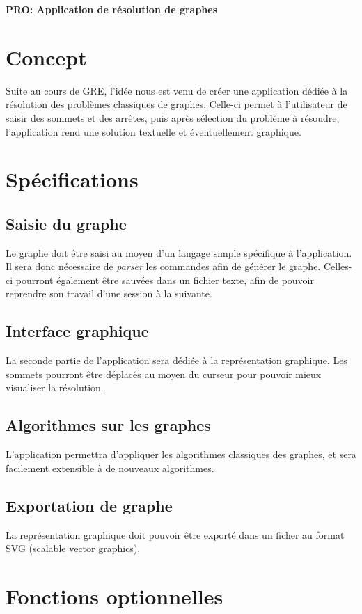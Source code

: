 \documentclass[french]{article}
\begin{document}
	\centering
	\large{\textbf{PRO: Application de résolution de graphes}}
	
	\justify
	
	\section{Concept}
		Suite au cours de GRE, l'idée nous est venu de créer une application dédiée à la résolution des problèmes classiques de graphes. Celle-ci permet à l'utilisateur de saisir des sommets et des arrêtes, puis après sélection du problème à résoudre, l'application rend une solution textuelle et éventuellement graphique.
		
	\section{Spécifications}
		\subsection{Saisie du graphe}
			Le graphe doit être saisi au moyen d'un langage simple spécifique à l'application. Il sera donc nécessaire de \textit{parser} les commandes afin de générer le graphe. Celles-ci pourront également être sauvées dans un fichier texte, afin de pouvoir reprendre son travail d'une session à la suivante.
		
		\subsection{Interface graphique}
			La seconde partie de l'application sera dédiée à la représentation graphique. Les sommets pourront être déplacés au moyen du curseur pour pouvoir mieux visualiser la résolution.
			
		\subsection{Algorithmes sur les graphes}
			L'application permettra d'appliquer les algorithmes classiques des graphes, et sera facilement extensible à de nouveaux algorithmes. 
		
		\subsection{Exportation de graphe}
			La représentation graphique doit pouvoir être exporté dans un ficher au format SVG (scalable vector graphics).
		
	\section{Fonctions optionnelles}
\end{document}
